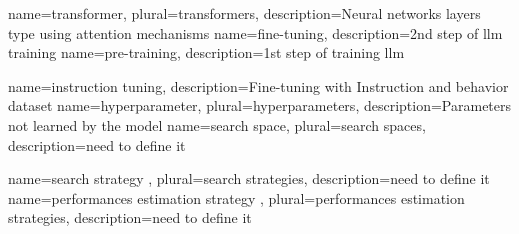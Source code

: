 {
    name=transformer,
    plural=transformers,
    description={Neural networks layers type using attention mechanisms}
}
{
    name=fine-tuning,
    description={2nd step of \acrshort{llm} training}
}
{
    name=pre-training,
    description={1st step of training \acrshort{llm}}
}

{
    name=instruction tuning,
    description={Fine-tuning with Instruction and behavior dataset}
}
{
    name=hyperparameter,
    plural=hyperparameters,
    description={Parameters not learned by the model}
}
{
    name=search space,
    plural=search spaces,
    description={need to define it}
}

{
    name=search strategy ,
    plural=search strategies,
    description={need to define it}
}
{
    name=performances estimation strategy ,
    plural=performances estimation strategies,
    description={need to define it}
}
